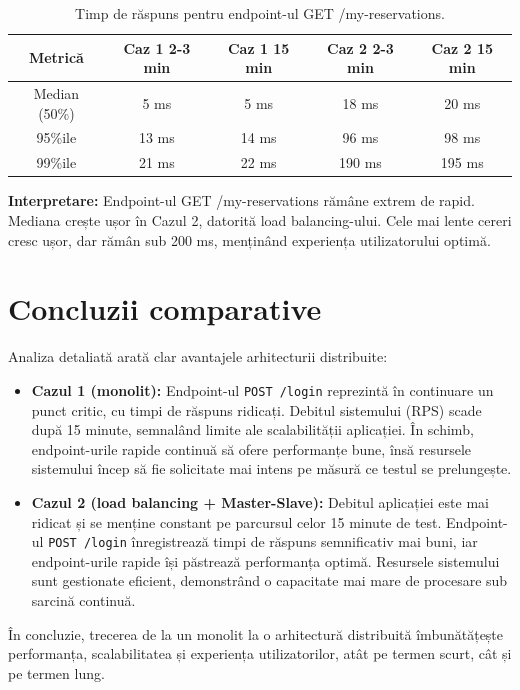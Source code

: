\documentclass[12pt, a4paper, oneside, romanian]{teza-upb}
\begin{document}
\begin{table}[h!]
\centering
\begin{tabular}{c|c|c|c|c}
\hline
Metrică & Caz 1 2-3 min & Caz 1 15 min & Caz 2 2-3 min & Caz 2 15 min \\
\hline
Median (50\%) & 5 ms & 5 ms & 18 ms & 20 ms \\
95\%ile & 13 ms & 14 ms & 96 ms & 98 ms \\
99\%ile & 21 ms & 22 ms & 190 ms & 195 ms \\
\hline
\end{tabular}
\caption{Timp de răspuns pentru endpoint-ul GET /my-reservations.}
\label{tab:my-reservations-comp-full}
\end{table}

\textbf{Interpretare:} Endpoint-ul GET /my-reservations rămâne extrem de rapid. Mediana crește ușor în Cazul 2, datorită load balancing-ului. Cele mai lente cereri cresc ușor, dar rămân sub 200 ms, menținând experiența utilizatorului optimă.

\section{Concluzii comparative}

Analiza detaliată arată clar avantajele arhitecturii distribuite:


\begin{itemize}
    \item \textbf{Cazul 1 (monolit):} Endpoint-ul \texttt{POST /login} reprezintă în continuare un punct critic, cu timpi de răspuns ridicați. Debitul sistemului (RPS) scade după 15 minute, semnalând limite ale scalabilității aplicației. În schimb, endpoint-urile rapide continuă să ofere performanțe bune, însă resursele sistemului încep să fie solicitate mai intens pe măsură ce testul se prelungește.
    \item \textbf{Cazul 2 (load balancing + Master-Slave):} Debitul aplicației este mai ridicat și se menține constant pe parcursul celor 15 minute de test. Endpoint-ul \texttt{POST /login} înregistrează timpi de răspuns semnificativ mai buni, iar endpoint-urile rapide își păstrează performanța optimă. Resursele sistemului sunt gestionate eficient, demonstrând o capacitate mai mare de procesare sub sarcină continuă.
\end{itemize}



În concluzie, trecerea de la un monolit la o arhitectură distribuită îmbunătățește performanța, scalabilitatea și experiența utilizatorilor, atât pe termen scurt, cât și pe termen lung.
\end{document}
